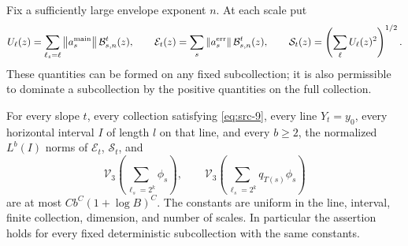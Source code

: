 Fix a sufficiently large envelope exponent $n$.  At each scale put
\[
 U_\ell(z)=\sum_{\ell_s=\ell}\left\|a_s^{\rm main}\right\|\mathcal B_{s,n}^{t}(z),
 \qquad
 \mathcal E_t(z)=\sum_s\left\|a_s^{\rm err}\right\|\mathcal B_{s,n}^{t}(z),
 \qquad
 \mathcal S_t(z)=\left(\sum_\ell U_\ell(z)^2\right)^{1/2}.
\]
These quantities can be formed on any fixed subcollection; it is also
permissible to dominate a subcollection by the positive quantities on
the full collection.

\begin{proposition}\label{conc:line-moments}
For every slope $t$, every collection satisfying \eqref{eq:src-9},
every line $Y_t=y_0$, every horizontal interval $I$ of length $l$ on
that line, and every $b\geq2$, the normalized $L^b(I)$ norms of
$\mathcal E_t$, $\mathcal S_t$, and
\[
 \mathcal V_3\left(\sum_{\ell_s=2^k}\phi_s\right),
 \qquad
 \mathcal V_3\left(\sum_{\ell_s=2^k}q_{T(s)}\phi_s\right)
\]
are at most $C b^C(1+\log B)^C$.
The constants are uniform in the line, interval, finite collection,
dimension, and number of scales.  In particular the assertion holds
for every fixed deterministic subcollection with the same constants.
\end{proposition}

